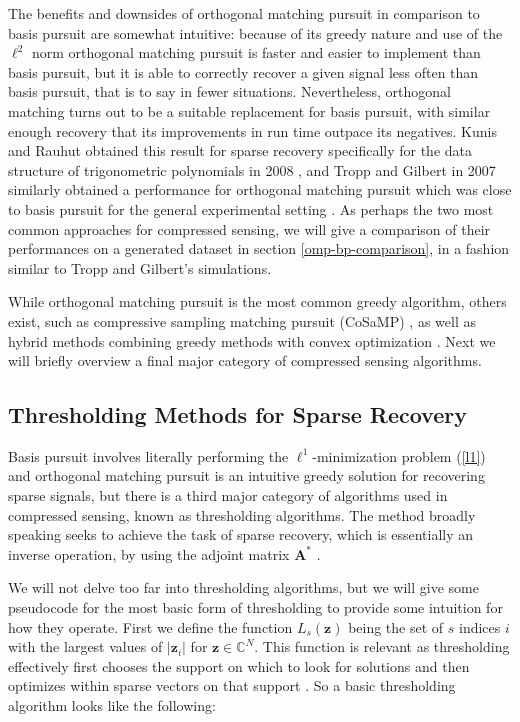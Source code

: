 \documentclass[12pt,a4paper]{amsart}
\numberwithin{equation}{section}
\theoremstyle{plain}
\theoremstyle{definition}
\newcommand{\BC}{\mathbb C}
\newcommand{\bdz}{\mathbf{z}}
\newcommand{\bdA}{\mathbf{A}}
\begin{document}
The benefits and downsides of orthogonal matching pursuit in comparison to basis pursuit are somewhat intuitive: because of its greedy nature and use of the $\ell^2$ norm orthogonal matching pursuit is faster and easier to implement than basis pursuit, but it is able to correctly recover a given signal less often than basis pursuit, that is to say in fewer situations. Nevertheless, orthogonal matching turns out to be a suitable replacement for basis pursuit, with similar enough recovery that its improvements in run time outpace its negatives. Kunis and Rauhut obtained this result for sparse recovery specifically for the data structure of trigonometric polynomials in 2008 \cite{kunis-rauhut}, and Tropp and Gilbert in 2007 similarly obtained a performance for orthogonal matching pursuit which was close to basis pursuit for the general experimental setting \cite{tropp-gilbert}. As perhaps the two most common approaches for compressed sensing, we will give a comparison of their performances on a generated dataset in section \ref{omp-bp-comparison}, in a fashion similar to Tropp and Gilbert's simulations.

While orthogonal matching pursuit is the most common greedy algorithm, others exist, such as compressive sampling matching pursuit (CoSaMP) \cite{fou-rau}, as well as hybrid methods combining greedy methods with convex optimization \cite{narayanan}. Next we will briefly overview a final major category of compressed sensing algorithms.

\subsection{Thresholding Methods for Sparse Recovery}\label{thresh}

Basis pursuit involves literally performing the $\ell^1$-minimization problem (\ref{l1}) and orthogonal matching pursuit is an intuitive greedy solution for recovering sparse signals, but there is a third major category of algorithms used in compressed sensing, known as thresholding algorithms. The method broadly speaking seeks to achieve the task of sparse recovery, which is essentially an inverse operation, by using the adjoint matrix $\bdA^*$ \cite{fou-rau}.

We will not delve too far into thresholding algorithms, but we will give some pseudocode for the most basic form of thresholding to provide some intuition for how they operate. First we define the function $L_s(\bdz)$ being the set of $s$ indices $i$ with the largest values of $|\bdz_i|$ for $\bdz\in\BC^N$. This function is relevant as thresholding effectively first chooses the support on which to look for solutions and then optimizes within sparse vectors on that support \cite{fou-rau}. So a basic thresholding algorithm looks like the following:
\end{document}
